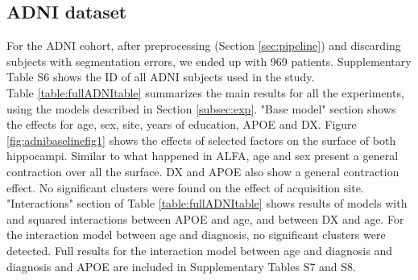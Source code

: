 \subsection{ADNI dataset}

For the ADNI cohort, after preprocessing (Section \ref{sec:pipeline}) and discarding subjects with segmentation errors, we ended up with 969 patients. Supplementary Table S6 shows the ID of all ADNI subjects used in the study. \\

Table \ref{table:fullADNItable} summarizes the main results for all the experiments, using the models described in Section \ref{subsec:exp}. "Base model" section shows the effects for age, sex, site, years of education, APOE and DX. Figure \ref{fig:adnibaselinefig1} shows the effects of selected factors on the surface of both hippocampi. Similar to what happened in ALFA, age and sex present a general contraction over all the surface. DX and APOE also show a general contraction effect. No significant clusters were found on the effect of acquisition site. "Interactions" section of Table \ref{table:fullADNItable} shows results of models with and squared interactions between APOE and age, and between DX and age. For the interaction model between age and diagnosis, no significant clusters were detected. Full results for the interaction model between age and diagnosis and diagnosis and APOE are included in Supplementary Tables S7 and S8. \\

